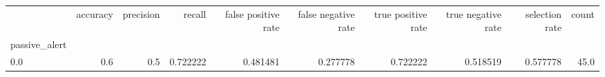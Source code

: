 \begin{tabular}{lrrrrrrrrr}
\toprule
{} &  accuracy &  precision &    recall &  false positive rate &  false negative rate &  true positive rate &  true negative rate &  selection rate &  count \\
passive\_alert &           &            &           &                      &                      &                     &                     &                 &        \\
\midrule
0.0           &       0.6 &        0.5 &  0.722222 &             0.481481 &             0.277778 &            0.722222 &            0.518519 &        0.577778 &   45.0 \\
\bottomrule
\end{tabular}
